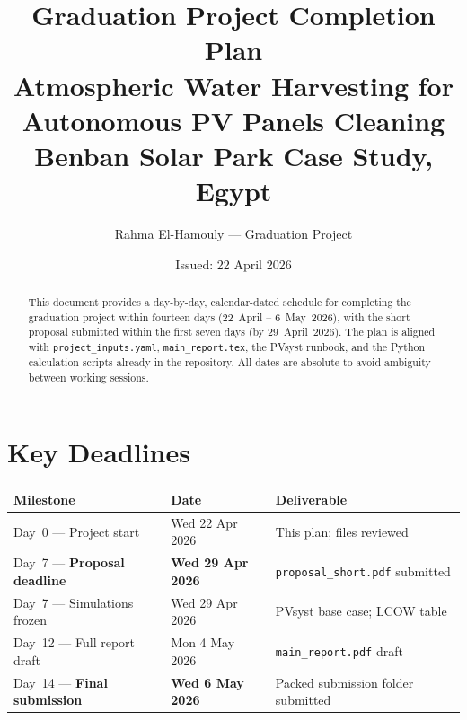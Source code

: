 \documentclass[11pt,a4paper]{article}
\title{\textbf{Graduation Project Completion Plan}\\[0.4em]
\large Atmospheric Water Harvesting for Autonomous PV Panels Cleaning\\[0.2em]
\normalsize Benban Solar Park Case Study, Egypt}
\author{Rahma El-Hamouly --- Graduation Project}
\date{Issued: 22 April 2026}
\begin{document}
\maketitle

\begin{abstract}
\noindent
This document provides a day-by-day, calendar-dated schedule for completing the graduation
project within fourteen days (22~April -- 6~May~2026), with the short proposal submitted
within the first seven days (by 29~April~2026). The plan is aligned with
\texttt{project\_inputs.yaml}, \texttt{main\_report.tex}, the PVsyst runbook, and the
Python calculation scripts already in the repository. All dates are absolute to avoid
ambiguity between working sessions.
\end{abstract}

\tableofcontents
\newpage

\section{Key Deadlines}

\begin{center}
\renewcommand{\arraystretch}{1.35}
\begin{tabular}{@{}lll@{}}
\toprule
\textbf{Milestone}                          & \textbf{Date}            & \textbf{Deliverable} \\
\midrule
Day~0 --- Project start                     & Wed 22 Apr 2026          & This plan; files reviewed \\
\rowcolor{rowA}
Day~7 --- \textbf{Proposal deadline}        & \textbf{Wed 29 Apr 2026} & \texttt{proposal\_short.pdf} submitted \\
Day~7 --- Simulations frozen                & Wed 29 Apr 2026          & PVsyst base case; LCOW table \\
Day~12 --- Full report draft                & Mon 4 May 2026           & \texttt{main\_report.pdf} draft \\
\rowcolor{rowD}
Day~14 --- \textbf{Final submission}        & \textbf{Wed 6 May 2026}  & Packed submission folder submitted \\
\bottomrule
\end{tabular}
\end{center}

\end{document}
